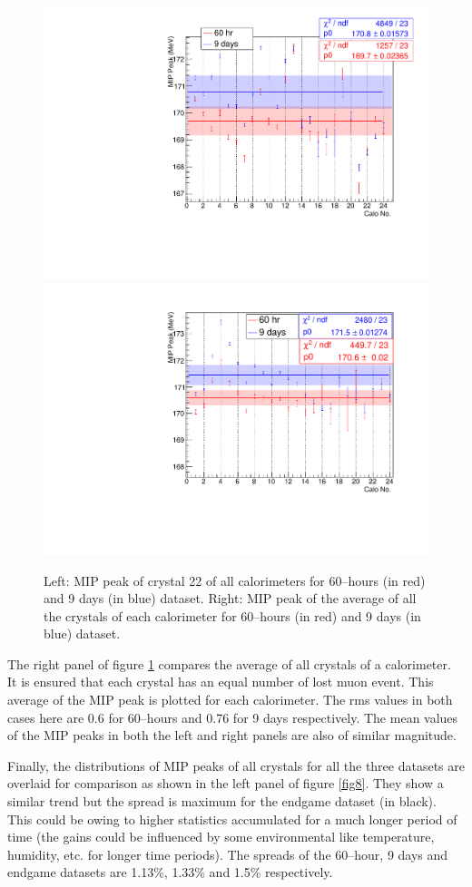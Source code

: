 \documentclass[article,accept,moreauthors,pdftex,10pt,a4paper]{../MDPI_template/Definitions/mdpi}
\begin{document}
\begin{figure}[H]
\centering
\includegraphics[width=7 cm]{allCalo_xtal22_1.pdf}
\includegraphics[width=7 cm]{allCalo_wt_1.pdf}
\caption{\label{fig7}Left: MIP peak of crystal 22 of all calorimeters for 60--hours (in red) and 9 days (in blue) dataset. 
Right: MIP peak of the average of all the crystals of each calorimeter for 60--hours 
(in red) and 9 days (in blue) dataset. }
\end{figure}  

The right panel of figure \ref{fig7} compares the average of all crystals of a calorimeter. 
It is ensured that each crystal has an equal number of lost muon event. 
This average of the MIP peak is plotted for each calorimeter. The rms 
values in both cases here are 0.6 for 60--hours and 0.76 for 9 days respectively. The mean values of the MIP 
peaks in both the left and right panels are also of similar magnitude. 

Finally, the distributions of MIP peaks of all crystals for all the three datasets are overlaid for comparison 
as shown in the left panel of figure \ref{fig8}. They show a similar trend but the spread is maximum for the endgame 
dataset (in black). This could be owing to higher statistics accumulated for a much longer period of time 
(the gains could be influenced by some environmental like temperature, humidity, etc. for longer time periods). 
The spreads of the 60--hour, 9 days and endgame datasets are 1.13\%, 1.33\% and 1.5\% respectively. 
\end{document}
